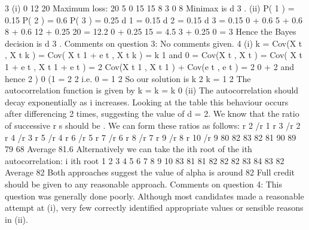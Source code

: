 \documentclass[a4paper,12pt]{article}
\begin{document}
3
(i)
0
12
20
Maximum loss: 20
5
0
15
15
8
3
0
8
Minimax is d 3 .
(ii)
P( 1 ) = 0.15
P( 2 ) = 0.6
P( 3 ) = 0.25
d 1 = 0.15
d 2 = 0.15
d 3 = 0.15
0 + 0.6
5 + 0.6
8 + 0.6
12 + 0.25 20 = 12.2
0 + 0.25 15 = 4.5
3 + 0.25 0 = 3
Hence the Bayes decision is d 3 .
Comments on question 3: No comments given.
4
(i)
k
= Cov(X t , X t k )
= Cov( X t 1 + e t , X t k )
= k 1
and
0
= Cov(X t , X t )
= Cov( X t 1 + e t , X t 1 + e t )
= 2 Cov(X t 1 , X t 1 ) + Cov(e t , e t )
= 2 0 + 2
and hence
2 )
0 (1
=
2
2
i.e.
0 =
1
2
So our solution is
k 2
k =
1
2
The autocorrelation function is given by
k
=
k
=
k
0
(ii)
The autocorrelation should decay exponentially as i increases. Looking at the table this behaviour occurs after differencing 2 times, suggesting the value of d = 2.
We know that the ratio of successive r s should be . We can form these
ratios as follows:
r 2 /r 1
r 3 /r 2
r 4 /r 3
r 5 /r 4
r 6 /r 5
r 7 /r 6
r 8 /r 7
r 9 /r 8
r 10 /r 9 80%
82%
83%
82%
81%
90%
89%
79%
68%
Average 81.6%
Alternatively we can take the ith root of the ith autocorrelation:
i ith root
1
2
3
4
5
6
7
8
9
10 83%
81%
81%
82%
82%
82%
83%
84%
83%
82%
Average 82%
Both approaches suggest the value of alpha is around 82%
Full credit should be given to any reasonable approach.
Comments on question 4: This question was generally done poorly. Although most
candidates made a reasonable attempt at (i), very few correctly identified appropriate values
or sensible reasons in (ii).
\end{document}

